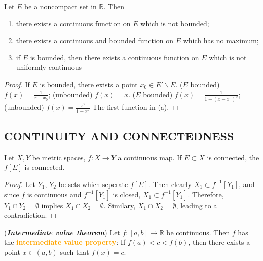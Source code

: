 \begin{theorem}
Let $E$ be a noncompact set in $\mathbb{R}$. Then
\begin{enumerate}[label={(\alph*)}]
\item there exists a continuous function on $E$ which is not bounded;
\item there exists a continuous and bounded function on $E$ which has no maximum;
\item if $E$ is bounded, then there exists a continuous function on $E$ which is not uniformly continuous
\end{enumerate}
\end{theorem}
\begin{proof}
If $E$ is bounded, there exists a point $x_0\in E'\backslash E$. 
 ($E$ bounded) $f(x)=\frac{1}{x-x_0}$; (unbounded) $f(x)=x$.
 ($E$ bounded) $f(x)=\frac{1}{1+(x-x_0)^2}$; (unbounded) $f(x)=\frac{x^2}{1+x^2}$
 The first function in (a).
\end{proof}

\subsection{CONTINUITY AND CONNECTEDNESS}
\begin{theorem}
Let $X,Y$ be metric spaces, $f:X\to Y$ a continuous map. If $E\subset X$ is connected, the $f[E]$ is connected.
\end{theorem}
\begin{proof}
Let $Y_1$, $Y_2$ be sets which seperate $f[E]$. Then clearly $X_1\subset f^{-1}[Y_1]$, and since $f$ is continuous and $f^{-1}[\overline{Y_1}]$ is closed, $\overline{X_1}\subset f^{-1}[\overline{Y_1}]$. Therefore, $\overline{Y_1}\cap Y_2=\emptyset$ implies $\overline{X_1}\cap X_2=\emptyset$. Similary, $X_1\cap \overline{X_2}=\emptyset$, leading to a contradiction.
\end{proof}

\begin{corollary}
(\textbf{\emph{Intermediate value theorem}}) Let $f:[a,b]\to \mathbb{R}$ be continuous. Then $f$ has the \textbf{\textcolor{orange}{intermediate value property}}: If $f(a)<c<f(b)$, then there exists a point $x\in(a,b)$ such that $f(x)=c$.
\end{corollary}



